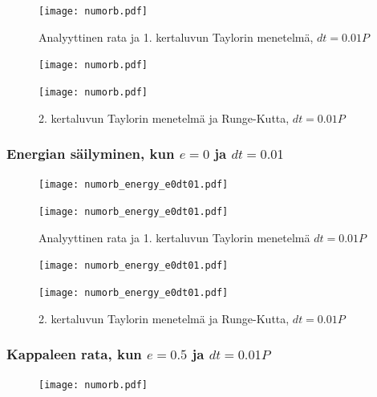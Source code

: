 \documentclass[12pt, a4paper]{article}
\begin{document}
\begin{figure}[H]
\vspace*{-2.5cm}
\texttt{[image: numorb.pdf]}%
\caption{Analyyttinen rata ja 1. kertaluvun Taylorin menetelmä, $dt=0.01P$}
\end{figure}

\newpage
\begin{figure}[H]
\texttt{[image: numorb.pdf]}%
\end{figure}

\begin{figure}[H]%
\vspace*{-2.5cm}
\texttt{[image: numorb.pdf]}%
\caption{2. kertaluvun Taylorin menetelmä ja Runge-Kutta, $dt=0.01P$}
\end{figure}

\newpage
\subsubsection{Energian säilyminen, kun $e=0$ ja $dt=0.01$}
\begin{figure}[H]
\vspace*{-1cm}
\texttt{[image: numorb\_energy\_e0dt01.pdf]}
\end{figure}

\begin{figure}[H]%
\vspace*{-2cm}
\texttt{[image: numorb\_energy\_e0dt01.pdf]}%
\caption{Analyyttinen rata ja 1. kertaluvun Taylorin menetelmä $dt=0.01P$}
\end{figure}

\newpage
\begin{figure}[H]%
\texttt{[image: numorb\_energy\_e0dt01.pdf]}%
\end{figure}

\begin{figure}[H]%
\vspace*{-2cm}
\texttt{[image: numorb\_energy\_e0dt01.pdf]}%
\caption{2. kertaluvun Taylorin menetelmä ja Runge-Kutta, $dt=0.01P$}
\end{figure}

\newpage
\subsubsection{Kappaleen rata, kun $e=0.5$ ja $dt=0.01P$}
\begin{figure}[H]%
\vspace*{-1.5cm}
\texttt{[image: numorb.pdf]}%
\end{figure}\label{ke05}
\end{document}
